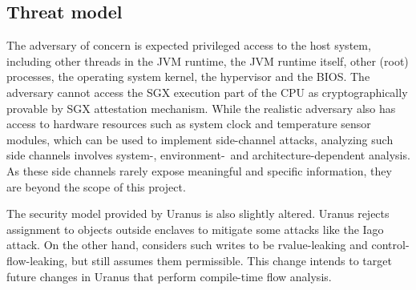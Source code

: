 \subsection{Threat model}\label{subsec:threat-model}
The adversary of concern is expected privileged access to the host system,
including other threads in the \ac{JVM} runtime, the \ac{JVM} runtime itself,
other (root) processes, the operating system kernel,
the hypervisor and the BIOS.
The adversary cannot access the \ac{SGX} execution part of the CPU
as cryptographically provable by SGX attestation mechanism.
While the realistic adversary also has access to hardware resources
such as system clock and temperature sensor modules,
which can be used to implement side-channel attacks,
analyzing such side channels involves
system-, environment-~and architecture-dependent analysis.
As these side channels rarely expose meaningful and specific information,
they are beyond the scope of this project.

The security model provided by Uranus is also slightly altered.
Uranus rejects assignment to objects outside enclaves
to mitigate some attacks like the Iago attack.
On the other hand, \pname{} considers such writes to be rvalue-leaking and control-flow-leaking,
but still assumes them permissible.
This change intends to target future changes in Uranus
that perform compile-time flow analysis.
